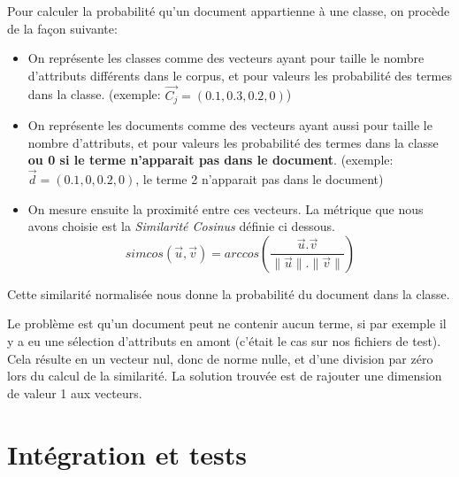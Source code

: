 \documentclass{article}
\begin{document}
\medskip
Pour calculer la probabilité qu'un document appartienne à une classe, on procède de la façon suivante:
\begin{itemize}
\item On représente les classes comme des vecteurs ayant pour taille le nombre d'attributs différents dans le corpus, et pour valeurs les probabilité des termes dans la classe. (exemple: $\vec{C_j} = (0.1,0.3,0.2,0)$)
\item On représente les documents comme des vecteurs ayant aussi pour taille le nombre d'attributs, et pour valeurs les probabilité des termes dans la classe \textbf{ou 0 si le terme n'apparait pas dans le document}. (exemple: $\vec{d} = (0.1,0,0.2,0)$, le terme 2 n'apparait pas dans le document)
\item On mesure ensuite la proximité entre ces vecteurs. La métrique que nous avons choisie est la \textit{Similarité Cosinus} définie ci dessous.
\[simcos(\vec{u},\vec{v}) = arccos( \frac{\vec{u}.\vec{v}}{\|\vec{u}\|.\|\vec{v}\|})\]
\end{itemize}
Cette similarité normalisée nous donne la probabilité du document dans la classe.

\medskip

Le problème est qu'un document peut ne contenir aucun terme, si par exemple il y a eu une sélection d'attributs en amont (c'était le cas sur nos fichiers de test). Cela résulte en un vecteur nul, donc de norme nulle, et d'une division par zéro lors du calcul de la similarité. La solution trouvée est de rajouter une dimension de valeur 1 aux vecteurs.




\section{Intégration et tests}
\end{document}
